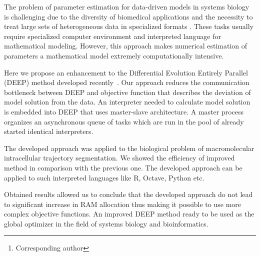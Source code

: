 \documentclass[12pt, a4paper]{article} %
\begin{document}

\renewcommand{\abstractname}{\large \textbf{\uppercase{
    Deep: optimizer with embedded interpreter\\
}}}
\begin{abstract}
    \normalsize %
    \bigskip %
    \noindent A.~V.~Svichkarev\footnote[*]{Corresponding author}, K.~N.~Kozlov \\
    \noindent
    System biology and bioinformatics lab, IAMM,
    Peter the Great St.Petersburg Polytechnic University,
St.Petersburg, Russia \\
    \noindent e-mail: tolik0393@bionet.nsc.ru \\
\end{abstract}

The problem of parameter estimation
for data-driven models in systems biology
is challenging due to the diversity
of biomedical applications and
the necessity to treat large sets of
heterogeneous data in specialized formats \cite{mendes1998non}.
These tasks usually require
specialized computer environment
and interpreted language for
mathematical modeling.
However, this approach makes
numerical estimation of parameters
a mathematical model
extremely computationally intensive.

Here we propose
an enhancement to the
Differential Evolution Entirely Parallel (DEEP) method
developed recently~\cite{Kozlov11}.
Our approach reduces the
communication bottleneck
between DEEP and objective function
that describes the deviation
of model solution
from the data.
An interpreter needed to
calculate model solution
is embedded into
DEEP that uses
master-slave architecture.
A master process
organizes an asynchronous queue
of tasks which are run
in the pool of
already started identical interpreters.

The developed approach was
applied to the biological problem
of macromolecular intracellular
trajectory segmentation.
We showed the efficiency of improved method
in comparison with the previous one.
The developed approach can be applied to
such interpreted languages like
R, Octave, Python etc.

Obtained results allowed us
to conclude that
the developed approach
do not lead to significant increase
in RAM allocation thus making
it possible to use
more complex objective functions.
An improved DEEP method ready
to be used as the global optimizer
in the field of systems biology
and bioinformatics.

\vfill %
\end{document}
